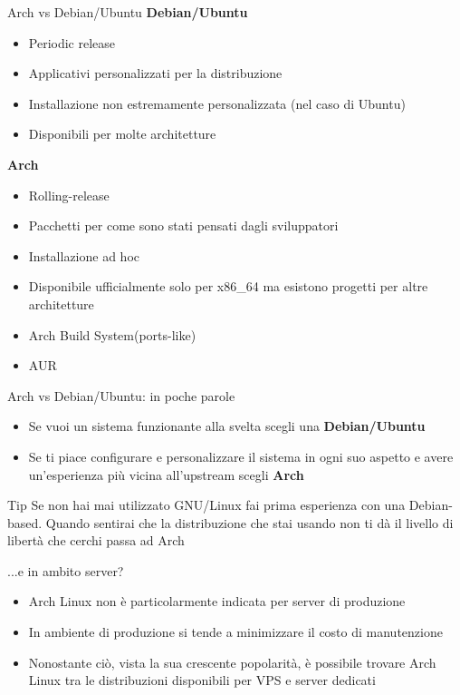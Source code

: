 \begin{frame}{Arch vs Debian/Ubuntu}
    \textbf{Debian/Ubuntu}
    \begin{itemize}
        \item Periodic release
        \item Applicativi personalizzati per la distribuzione
        \item Installazione non estremamente personalizzata (nel caso di Ubuntu)
        \item Disponibili per molte architetture
    \end{itemize}

    \textbf{Arch}
    \begin{itemize}
        \item Rolling-release
        \item Pacchetti per come sono stati pensati dagli sviluppatori
        \item Installazione ad hoc
        \item Disponibile ufficialmente solo per x86\_64 ma esistono progetti per altre architetture
        \item Arch Build System(ports-like)
        \item AUR
    \end{itemize}
\end{frame}

\begin{frame}{Arch vs Debian/Ubuntu: in poche parole}
    \begin{itemize}
        \item Se vuoi un sistema funzionante alla svelta scegli una \textbf{Debian/Ubuntu}
        \item Se ti piace configurare e personalizzare il sistema in ogni suo aspetto e avere un'esperienza
        più vicina all'upstream scegli \textbf{Arch}
    \end{itemize}

    
    \begin{alertblock}{Tip}
        Se non hai mai utilizzato GNU/Linux fai prima esperienza con una Debian-based. Quando sentirai
        che la distribuzione che stai usando non ti dà il livello di libertà che cerchi passa ad Arch
    \end{alertblock}
\end{frame}

\begin{frame}{...e in ambito server?}
    \begin{itemize}
        \item Arch Linux non è particolarmente indicata per server di produzione
        \item In ambiente di produzione si tende a minimizzare il costo di manutenzione
        \item Nonostante ciò, vista la sua crescente popolarità, è possibile trovare Arch Linux tra le distribuzioni disponibili per VPS e server dedicati
    \end{itemize}
\end{frame}

